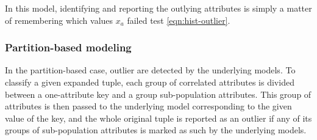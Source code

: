 In this model, identifying and reporting the outlying attributes is simply a matter of remembering which values $x_a$ failed test \eqref{eqn:hist-outlier}.

\subsubsection{Partition-based modeling}
In the partition-based case, outlier are detected by the underlying models. To classify a given expanded tuple, each group of correlated attributes is divided between a one-attribute key and a group sub-population attributes. This group of attributes is then passed to the underlying model corresponding to the given value of the key, and the whole original tuple is reported as an outlier if any of its groups of sub-population attributes is marked as such by the underlying models.
